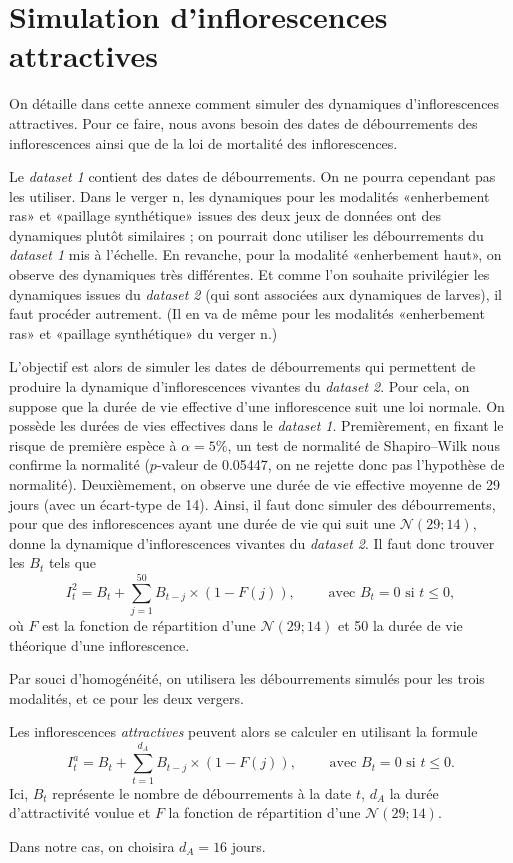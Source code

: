 \chapter{Simulation d'inflorescences attractives} 
\label{chap:deb}

On détaille dans cette annexe comment simuler des dynamiques d'inflorescences attractives.
Pour ce faire, nous avons besoin des dates de débourrements des inflorescences ainsi que de la loi de mortalité des inflorescences.


Le \emph{dataset 1} contient des dates de débourrements. On ne pourra cependant pas les utiliser.
Dans le verger n, les dynamiques pour les modalités «enherbement ras» et «paillage synthétique» issues des deux jeux de données ont des dynamiques plutôt similaires ; on pourrait donc utiliser les débourrements du \emph{dataset 1} mis à l'échelle.
En revanche, pour la modalité «enherbement haut», on observe des dynamiques très différentes. 
Et comme l'on souhaite privilégier les dynamiques issues du \emph{dataset 2} (qui sont associées aux dynamiques de larves), il faut procéder autrement.
(Il en va de même pour les modalités «enherbement ras» et «paillage synthétique» du verger n.)
 
L'objectif est alors de simuler les dates de débourrements qui permettent de produire la dynamique d'inflorescences vivantes du \emph{dataset 2}.
Pour cela, on suppose que la durée de vie effective d'une inflorescence suit une loi normale.
On possède les durées de vies effectives dans le \emph{dataset 1}.
Premièrement, en fixant le risque de première espèce à $\alpha = 5\%$, un test de normalité de Shapiro--Wilk nous confirme la normalité ($p$-valeur de 0.05447, on ne rejette donc pas l'hypothèse de normalité).
Deuxièmement, on observe une durée de vie effective moyenne de 29 jours (avec un écart-type de 14).
Ainsi, il faut donc simuler des débourrements, pour que des inflorescences ayant une durée de vie qui suit une $\mathcal{N}\left( 29; 14 \right)$, donne la dynamique d'inflorescences vivantes du \emph{dataset 2}.
Il faut donc trouver les $B_t$ tels que 
\[
I_{t}^{2} = B_t + \sum_{j = 1}^{50} B_{t - j} \times \left( 1 - F\left( j \right) \right),  \qquad \text{ avec } B_{t} = 0 \text{ si } t \leq 0,
\]
où $F$ est la fonction de répartition d'une $\mathcal{N}\left( 29;14 \right)$ et 50 la durée de vie théorique d'une inflorescence.
 
Par souci d'homogénéité, on utilisera les débourrements simulés pour les trois modalités, et ce pour les deux vergers.



Les inflorescences \emph{attractives} peuvent alors se calculer en utilisant la formule
\[
I_{t}^{a} = B_t + \sum_{t = 1}^{d_A} B_{t-j} \times \left( 1 - F(j) \right), \qquad \text{ avec } B_{t} = 0 \text{ si } t \leq 0. 
\]
Ici, $B_t$ représente le nombre de débourrements à la date $t$, $d_A$ la durée d'attractivité voulue et $F$ la fonction de répartition d'une $\mathcal{N}\left( 29; 14 \right)$.

Dans notre cas, on choisira $d_A = 16$ jours.
